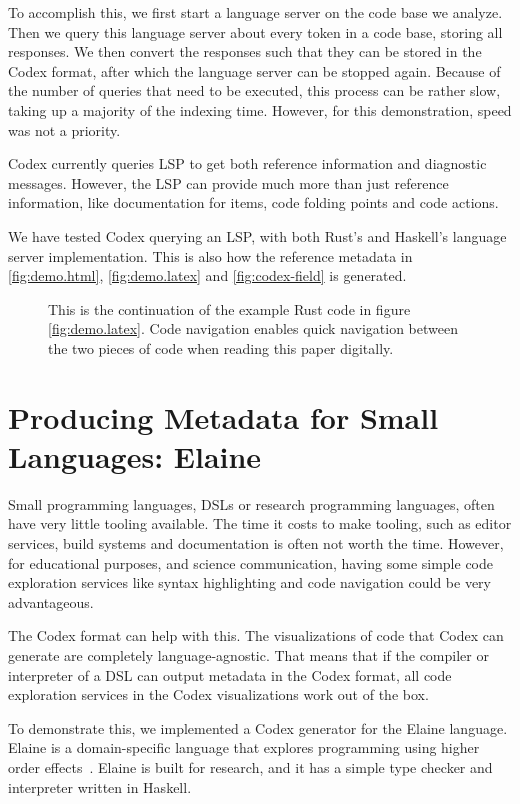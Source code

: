 To accomplish this, we first start a language server on the code base we analyze.
Then we query this language server about every token in a code base, storing all responses.
We then convert the responses such that they can be stored in the Codex format, after which the language server can be stopped again.
Because of the number of queries that need to be executed, this process can be rather slow, taking up a majority of the indexing time.
However, for this demonstration, speed was not a priority.

Codex currently queries \ac{LSP} to get both reference information and diagnostic messages.
However, the LSP can provide much more than just reference information, like documentation for items, code folding points and code actions.

We have tested Codex querying an \ac{LSP}, with both Rust's and Haskell's language server implementation.
This is also how the reference metadata in \cref{fig:demo.html}, \cref{fig:demo.latex} and \cref{fig:codex-field} is generated.

\begin{figure}
    \centering
    \codeBRs
    \caption{This is the continuation of the example Rust code in figure \cref{fig:demo.latex}. Code navigation enables quick navigation between the two pieces of code when reading this paper digitally.}
    \label{fig:demo.latex.reference}
\end{figure}


\section{Producing Metadata for Small Languages: Elaine}
\label{sec:elaine}%
Small programming languages, \acp{DSL} or research programming languages, often have very little tooling available.
The time it costs to make tooling, such as editor services, build systems and documentation is often not worth the time.
However, for educational purposes, and science communication, having some simple code exploration services like syntax highlighting
and code navigation could be very advantageous.

The Codex format can help with this. The visualizations of code that Codex can generate are completely language-agnostic.
That means that if the compiler or interpreter of a \ac{DSL} can output metadata in the Codex format, all code exploration services in the Codex visualizations work out of the box.

To demonstrate this, we implemented a Codex generator for the Elaine language.
Elaine is a domain-specific language
that explores programming using higher order effects~\cite{PoulsenR23, elaine}.
Elaine is built for research, and it has a simple type checker and interpreter written in Haskell.

